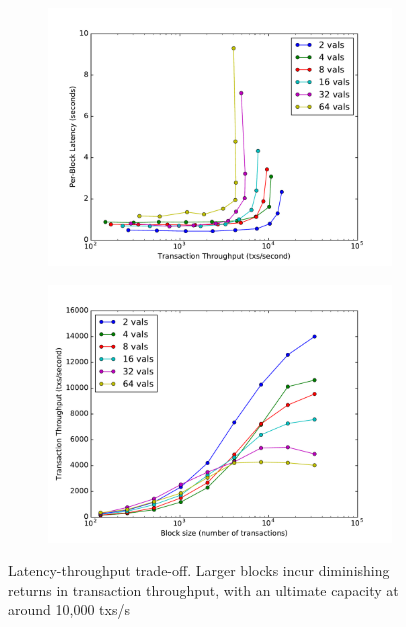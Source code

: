 \begin{figure}[]
	\centering
	\begin{subfigure}{0.8 \textwidth}
		\includegraphics[width=\linewidth,height=\textheight,keepaspectratio]{figures/throughput/latency-throughput.pdf}
	\end{subfigure}

	\begin{subfigure}{0.8 \textwidth}
		\includegraphics[width=\linewidth,height=\textheight,keepaspectratio]{figures/throughput/throughput-blocksize.pdf}
	\end{subfigure}
	\centering
	\caption[Latency-Throughput trade-off in non-faulty global network]{Latency-throughput trade-off.
Larger blocks incur diminishing 
returns in transaction throughput, with an ultimate capacity at around 10,000 txs/s}
	\label{fig:exp:throughput}
\end{figure}

